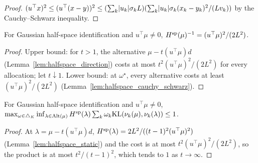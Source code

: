 \begin{proof}
  \leanok
  $(u^{\top} x)^2 \le (u^{\top}(x - y))^2 \le (\sum_k \lvert u_k \rvert \sigma_k L) (\sum_k \lvert u_k \rvert
  \sigma_k (x_k - y_k)^2 / (L v_k))$ by the Cauchy--Schwarz inequality.
\end{proof}

\begin{lemma}
  \label{lem:halfspace_static}
  \leanok
  For Gaussian half-space identification and $u^{\top} \mu \ne 0$,
  $H^{\mathrm{sp}}(\mu)^{-1} = (u^{\top} \mu)^2 / (2 L^2)$.
\end{lemma}

\begin{proof}
  \leanok
  Upper bound: for $t > 1$, the alternative $\mu - t (u^{\top} \mu) d$
  (Lemma~\ref{lem:halfspace_direction}) costs at most $t^2 (u^{\top} \mu)^2 / (2 L^2)$ for every
  allocation; let $t \downarrow 1$. Lower bound: at $\omega^{\star}$, every alternative costs at
  least $(u^{\top} \mu)^2 / (2 L^2)$ (Lemma~\ref{lem:halfspace_cauchy_schwarz}).
\end{proof}

\begin{lemma}
  \label{lem:halfspace_ratio}
  \leanok
  For Gaussian half-space identification and $u^{\top} \mu \ne 0$,
  $\max_{\omega \in \triangle_K} \inf_{\lambda \in \mathrm{Alt}(\mu)} H^{\mathrm{sp}}(\lambda) \sum_k \omega_k
  \mathrm{KL}(\nu_k(\mu), \nu_k(\lambda)) \le 1$.
\end{lemma}

\begin{proof}
  \leanok
  At $\lambda = \mu - t (u^{\top} \mu) d$, $H^{\mathrm{sp}}(\lambda) = 2 L^2 / ((t - 1)^2 (u^{\top} \mu)^2)$
  (Lemma~\ref{lem:halfspace_static}) and the cost is at most $t^2 (u^{\top} \mu)^2 / (2 L^2)$, so
  the product is at most $t^2 / (t - 1)^2$, which tends to $1$ as $t \to \infty$.
\end{proof}


